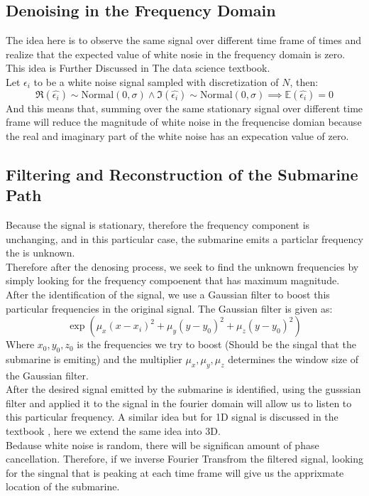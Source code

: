 \documentclass{article}
\begin{document}
\subsection{Denoising in the Frequency Domain}
    The idea here is to observe the same signal over different time frame of times and realize that the expected value of white nosie in the frequency domain is zero. This idea is Further Discussed in The data science textbook\cite{kutz_2013_pg316}.
    \\
    Let $\epsilon_i$ to be a white noise signal sampled with discretization of $N$, then: 
    \begin{equation}
        \Re(\widehat{\epsilon_i}) \sim\text{Normal}(0, \sigma) \wedge 
        \Im(\widehat{\epsilon_i}) \sim\text{Normal}(0, \sigma)
        \implies \mathbb{E}(\widehat{\epsilon_i}) = 0
    \end{equation}
    And this means that, summing over the same stationary signal over different time frame will reduce the magnitude of white noise in the frequencise domian because the real and imaginary part of the white noise has an expecation value of zero. 

\subsection{Filtering and Reconstruction of the Submarine Path}
    Because the signal is stationary, therefore the frequency component is unchanging, and in this particular case, the submarine emits a particlar frequency the is unknown. 
    \\
    Therefore after the denosing process, we seek to find the unknown frequencies by simply looking for the frequency compoenent that has maximum magnitude.
    \\
    After the identification of the signal, we use a Gaussian filter to boost this particular frequencies in the original signal. The Gaussian filter is given as: 
    \begin{equation}\label{eqn:gaussian-filter}
        \exp
        \left(\mu_x (x - x_i)^2 +
                \mu_y(y - y_0)^2
                +\mu_z(y - y_0)^2\right)
    \end{equation}
    Where $x_0, y_0, z_0$ is the frequencies we try to boost (Should be the singal that the submarine is emiting) and the multiplier $\mu_x, \mu_y, \mu_z$ determines the window size of the Gaussian filter. 
    \\
    After the desired signal emitted by the submarine is identified, using the gusssian filter and applied it to the signal in the fourier domain will allow us to listen to this particular frequency. A similar idea but for 1D signal is discussed in the textbook\cite{kutz_2013_pg312} , here we extend the same idea into 3D. 
    \\
    Bedause white noise is random, there will be significan amount of phase cancellation. Therefore, if we inverse Fourier Transfrom the filtered signal, looking for the singnal that is peaking at each time frame will give us the apprixmate location of the submarine. 
\end{document}
